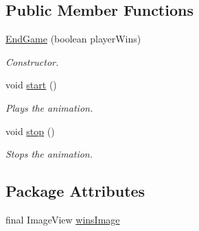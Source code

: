 \subsection*{Public Member Functions}
\begin{DoxyCompactItemize}
\item 
\hyperlink{classbattleship2D_1_1ui_1_1EndGame_ad64305c0b6ece6f62ece7581cabd11d3}{End\-Game} (boolean player\-Wins)
\begin{DoxyCompactList}\small\item\em Constructor. \end{DoxyCompactList}\item 
void \hyperlink{classbattleship2D_1_1ui_1_1EndGame_af0f158a999fabe77a5f8559daeb71a6a}{start} ()
\begin{DoxyCompactList}\small\item\em Plays the animation. \end{DoxyCompactList}\item 
void \hyperlink{classbattleship2D_1_1ui_1_1EndGame_a82f69c08cff75a2f0eb0b47b9982d838}{stop} ()
\begin{DoxyCompactList}\small\item\em Stops the animation. \end{DoxyCompactList}\end{DoxyCompactItemize}
\subsection*{Package Attributes}
\begin{DoxyCompactItemize}
\item 
final Image\-View \hyperlink{classbattleship2D_1_1ui_1_1EndGame_a81c8d84b9284288f67fff7273fd7e7e3}{wins\-Image}
\end{DoxyCompactItemize}

